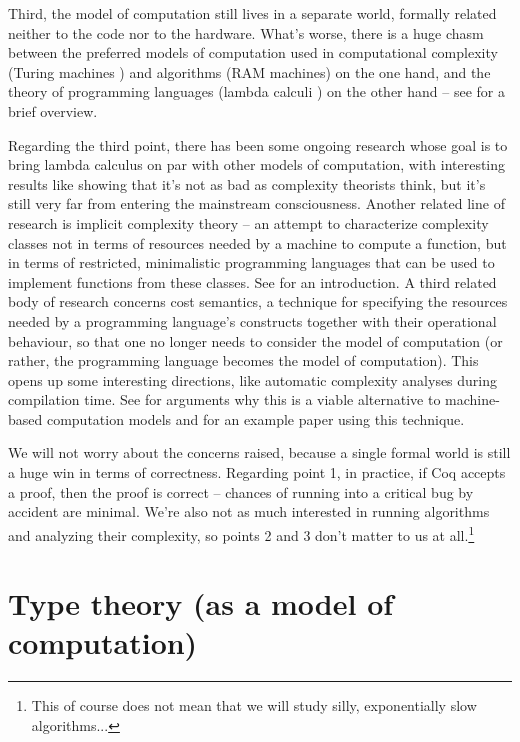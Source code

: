 \documentclass[declaration,mgr,english,shortabstract]{iithesis}
\begin{document}
Third, the model of computation still lives in a separate world, formally related neither to the code nor to the hardware. What's worse, there is a huge chasm between the preferred models of computation used in computational complexity (Turing machines \cite{Turing}) and algorithms (RAM machines) on the one hand, and the theory of programming languages (lambda calculi \cite{Church}) on the other hand -- see \cite{OtherTuringMachine} for a brief overview.

Regarding the third point, there has been some ongoing research whose goal is to bring lambda calculus on par with other models of computation, with interesting results like \cite{ReasonableMachine} showing that it's not as bad as complexity theorists think, but it's still very far from entering the mainstream consciousness. Another related line of research is implicit complexity theory -- an attempt to characterize complexity classes not in terms of resources needed by a machine to compute a function, but in terms of restricted, minimalistic programming languages that can be used to implement functions from these classes. See \cite{ICC1} \cite{ICC2} for an introduction. A third related body of research concerns cost semantics, a technique for specifying the resources needed by a programming language's constructs together with their operational behaviour, so that one no longer needs to consider the model of computation (or rather, the programming language becomes the model of computation). This opens up some interesting directions, like automatic complexity analyses during compilation time. See \cite{CostSemanticsBlog} for arguments why this is a viable alternative to machine-based computation models and \cite{CostSemantics} for an example paper using this technique.

We will not worry about the concerns raised, because a single formal world is still a huge win in terms of correctness. Regarding point 1, in practice, if Coq accepts a proof, then the proof is correct -- chances of running into a critical bug by accident are minimal. We're also not as much interested in running algorithms and analyzing their complexity, so points 2 and 3 don't matter to us at all.\footnote{This of course does not mean that we will study silly, exponentially slow algorithms...}

\section{Type theory (as a model of computation)} \label{mltt}
\end{document}
